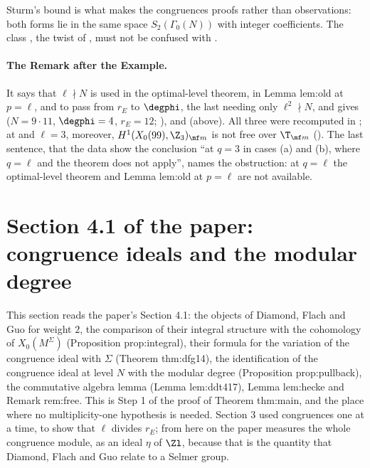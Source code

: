 \begin{sloppypar}
\noindent Sturm's bound is what makes the congruences proofs rather than observations: both forms lie in the same space $S_2(\Gamma_0(N))$ with integer coefficients. The class , the twist of , must not be confused with .

\paragraph{The Remark after the Example.} It says that $\ell\nmid N$ is used in the optimal-level theorem, in Lemma lem:old at $p=\ell$, and to pass from $r_E$ to $\degphi$, the last
needing only $\ell^2\nmid N$, and gives  ($N=9\cdot11$, $\degphi=4$, $r_E=12$; \cite[Table 1]{ARS12}),  and  (above). All three were recomputed in
; at  and $\ell=3$, moreover, $H^1(X_0(99),\Z_3)_{\mf m}$ is not free over $\T_{\mf m}$ (). The last sentence, that the data show the conclusion
``at $q=3$ in cases (a) and (b), where $q=\ell$ and the theorem does not apply'', names the obstruction: at $q=\ell$ the optimal-level theorem and Lemma lem:old at $p=\ell$ are not available.

\section[Paper 4.1: congruence ideals]{Section 4.1 of the paper: congruence ideals and the modular degree}\label{sec:paper:congruence-ideals}

This section reads the paper's Section 4.1: the objects of Diamond, Flach and Guo for weight $2$, the comparison of their integral structure with the
cohomology of $X_0(M^\Sigma)$ (Proposition prop:integral), their formula for the variation of the congruence ideal with $\Sigma$ (Theorem thm:dfg14), the identification
of the congruence ideal at level $N$ with the modular degree (Proposition prop:pullback), the commutative algebra lemma (Lemma lem:ddt417), Lemma lem:hecke and Remark
rem:free. This is Step 1 of the proof of Theorem thm:main, and the place where no multiplicity-one hypothesis is needed. Section 3 used congruences one at a time, to show that $\ell$ divides $r_E$; from here on the paper measures
the whole congruence module, as an ideal $\eta$ of $\Zl$, because that is the quantity that Diamond, Flach and Guo relate to a Selmer group.


\end{sloppypar}
